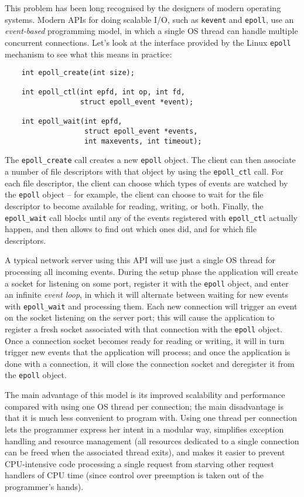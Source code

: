 \documentclass[a4paper,11pt,oneside]{report}
\begin{document}
This problem has been long recognised by the designers of modern operating
systems. Modern APIs for doing scalable I/O, such as \texttt{kevent} and
\texttt{epoll}, use an \textit{event-based} programming model, in which a single
OS thread can handle multiple concurrent connections. Let's look at the
interface provided by the Linux \texttt{epoll} mechanism to see what this means
in practice:

\begin{verbatim}
    int epoll_create(int size);

    int epoll_ctl(int epfd, int op, int fd,
                  struct epoll_event *event);

    int epoll_wait(int epfd,
                   struct epoll_event *events,
                   int maxevents, int timeout);
\end{verbatim}

The \texttt{epoll\_create} call creates a new \texttt{epoll} object. The client
can then associate a number of file descriptors with that object by using the
\texttt{epoll\_ctl} call. For each file descriptor, the client can choose which
types of events are watched by the \texttt{epoll} object -- for example, the
client can choose to wait for the file descriptor to become available for
reading, writing, or both. Finally, the \texttt{epoll\_wait} call blocks until
any of the events registered with \texttt{epoll\_ctl} actually happen, and then
allows to find out which ones did, and for which file descriptors.

A typical network server using this API will use just a single OS thread for
processing all incoming events. During the setup phase the application will
create a socket for listening on some port, register it with the \texttt{epoll}
object, and enter an infinite \textit{event loop}, in which it will alternate
between waiting for new events with \texttt{epoll\_wait} and processing
them. Each new connection will trigger an event on the socket listening on the
server port; this will cause the application to register a fresh socket
associated with that connection with the \texttt{epoll} object. Once a
connection socket becomes ready for reading or writing, it will in turn trigger
new events that the application will process; and once the application is done
with a connection, it will close the connection socket and deregister it from
the \texttt{epoll} object.

The main advantage of this model is its improved scalability and performance
compared with using one OS thread per connection; the main disadvantage is that
it is much less convenient to program with. Using one thread per connection lets
the programmer express her intent in a modular way, simplifies exception
handling and resource management (all resources dedicated to a single connection
can be freed when the associated thread exits), and makes it easier to prevent
CPU-intensive code processing a single request from starving other request
handlers of CPU time (since control over preemption is taken out of the
programmer's hands).
\end{document}
